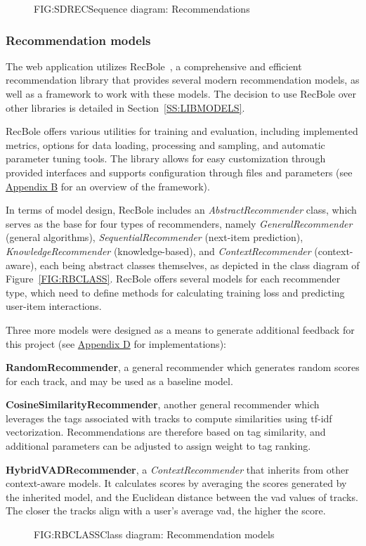 \begin{figure}[Sequence diagram: Recommendations]{FIG:SDREC}{Sequence diagram: Recommendations}
\end{figure}

\subsubsection{Recommendation models}

The web application utilizes RecBole~\cite{RECBOLE}, a comprehensive and efficient recommendation library that provides several modern recommendation models, as well as a framework to work with these models. The decision to use RecBole over other libraries is detailed in Section~\ref{SS:LIBMODELS}.

RecBole offers various utilities for training and evaluation, including implemented metrics, options for data loading, processing and sampling, and automatic parameter tuning tools. The library allows for easy customization through provided interfaces and supports configuration through files and parameters (see \hyperref[FIG:RBFRAMEWORK]{Appendix B} for an overview of the framework).

In terms of model design, RecBole includes an \emph{AbstractRecommender} class, which serves as the base for four types of recommenders, namely \emph{GeneralRecommender} (general algorithms), \emph{SequentialRecommender} (next-item prediction), \emph{KnowledgeRecommender} (knowledge-based), and \emph{ContextRecommender} (context-aware), each being abstract classes themselves, as depicted in the class diagram of Figure~\ref{FIG:RBCLASS}. RecBole offers several models for each recommender type, which need to define methods for calculating training loss and predicting user-item interactions.

Three more models were designed as a means to generate additional feedback for this project (see \hyperref[AP:MODELS]{Appendix D} for implementations):

\begin{compactitem}[\textbullet]
    \item \textbf{RandomRecommender}, a general recommender which generates random scores for each track, and may be used as a baseline model.
    \item \textbf{CosineSimilarityRecommender}, another general recommender which leverages the tags associated with tracks to compute similarities using \acs{tf}-\acs{idf} vectorization. Recommendations are therefore based on tag similarity, and additional parameters can be adjusted to assign weight to tag ranking.
    \item \textbf{HybridVADRecommender}, a \emph{ContextRecommender} that inherits from other context-aware models. It calculates scores by averaging the scores generated by the inherited model, and the Euclidean distance between the \acs{vad} values of tracks. The closer the tracks align with a user's average \acs{vad}, the higher the score.
\end{compactitem}

\begin{figure}[Class diagram: Recommendation models]{FIG:RBCLASS}{Class diagram: Recommendation models}
\end{figure}